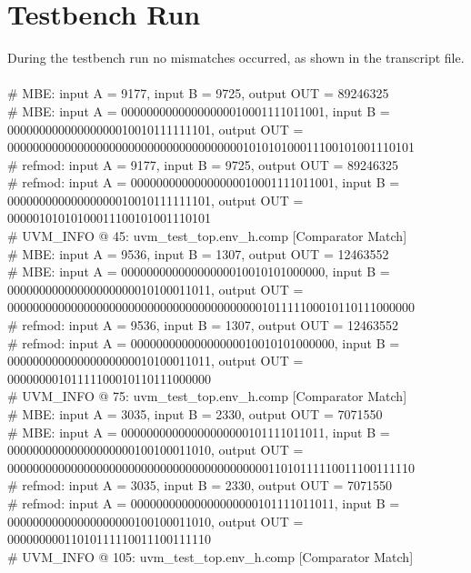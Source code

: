 \section{Testbench Run}

During the testbench run no mismatches occurred, as shown in the transcript file.\\
\\
\# MBE: input A =       9177, input B =       9725, output OUT =             89246325\\
\# MBE: input A = 00000000000000000010001111011001, input B = 00000000000000000010010111111101, output OUT = 0000000000000000000000000000000000000101010100011100101001110101\\
\# refmod: input A =        9177, input B =        9725, output OUT =    89246325\\
\# refmod: input A = 00000000000000000010001111011001, input B = 00000000000000000010010111111101, output OUT = 00000101010100011100101001110101\\
\# UVM\_INFO @ 45: uvm\_test\_top.env\_h.comp [Comparator Match] \\
\# MBE: input A =       9536, input B =       1307, output OUT =             12463552\\
\# MBE: input A = 00000000000000000010010101000000, input B = 00000000000000000000010100011011, output OUT = 0000000000000000000000000000000000000000101111100010110111000000\\
\# refmod: input A =        9536, input B =        1307, output OUT =    12463552\\
\# refmod: input A = 00000000000000000010010101000000, input B = 00000000000000000000010100011011, output OUT = 00000000101111100010110111000000\\
\# UVM\_INFO @ 75: uvm\_test\_top.env\_h.comp [Comparator Match] \\
\# MBE: input A =       3035, input B =       2330, output OUT =              7071550\\
\# MBE: input A = 00000000000000000000101111011011, input B = 00000000000000000000100100011010, output OUT = 0000000000000000000000000000000000000000011010111110011100111110\\
\# refmod: input A =        3035, input B =        2330, output OUT =     7071550\\
\# refmod: input A = 00000000000000000000101111011011, input B = 00000000000000000000100100011010, output OUT = 00000000011010111110011100111110\\
\# UVM\_INFO @ 105: uvm\_test\_top.env\_h.comp [Comparator Match] \\
